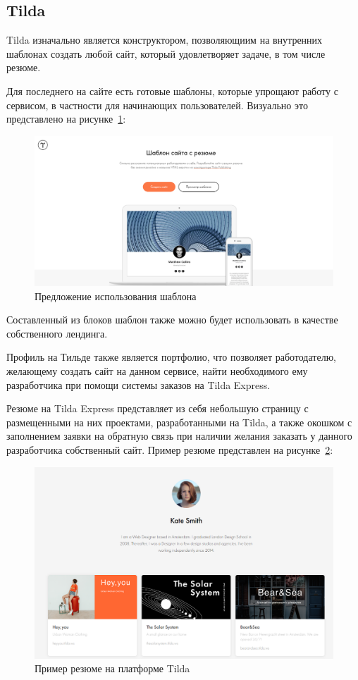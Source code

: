 \documentclass[master, och, pract]{SCWorks}
\begin{document}
\subsection{Tilda}
Tilda изначально является конструктором, позволяющиим на внутренних шаблонах создать 
любой сайт, который удовлетворяет задаче, в том числе резюме.

Для последнего на сайте есть готовые шаблоны, которые упрощают работу с сервисом, 
в частности для начинающих пользователей. Визуально это представлено на рисунке~\ref{fig:14}:
\begin{figure}[!ht]
    \centering
    \includegraphics[width=12cm]{images/image7.png}
    \caption{\label{fig:14}%
        Предложение использования шаблона}
\end{figure}

Составленный из блоков шаблон также можно будет использовать в качестве собственного лендинга.

Профиль на Тильде также является портфолио, что позволяет работодателю, желающему создать 
сайт на данном сервисе, найти необходимого ему разработчика при помощи системы 
заказов на Tilda Express.

Резюме на Tilda Express представляет из себя небольшую страницу с размещенными на 
них проектами, разработанными на Tilda, а также окошком с заполнением заявки на обратную 
связь при наличии желания заказать у данного разработчика собственный сайт. Пример резюме 
представлен на рисунке~\ref{fig:15}:
\begin{figure}[!ht]
    \centering
    \includegraphics[width=12cm]{images/image8.png}
    \caption{\label{fig:15}%
        Пример резюме на платформе Tilda}
\end{figure}
\end{document}
